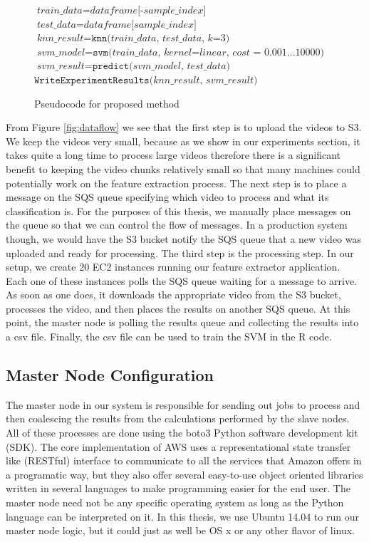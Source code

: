 \begin{figure}[h]
\begin{algorithmic}[1]
    \State $\textit{train\_data} = \textit{dataframe[-sample\_index]}$
    \State $\textit{test\_data} = \textit{dataframe[sample\_index]}$
    \State $\textit{knn\_result} = \texttt{knn(}\textit{train\_data, test\_data, k=3} \texttt{)}$
    \State $\textit{svm\_model} = \texttt{svm(}\textit{train\_data, kernel=linear, cost = 0.001...10000} \textit{)}$
    \State $\textit{svm\_result} = \texttt{predict(} \textit{svm\_model, test\_data} \texttt{)}$
  \EndFor
  \State $\texttt{WriteExperimentResults(} \textit{knn\_result, svm\_result} \texttt{)}$

\end{algorithmic}
\caption{Pseudocode for proposed method}
\label{alg:vida_pseudo_code}
\end{figure}

\FloatBarrier

From Figure \ref{fig:dataflow} we see that the first step is to upload
the videos to S3. We keep the videos very small, because as we show in our experiments
section, it takes quite a long time to process large videos therefore there is a
significant benefit to keeping the video chunks relatively small so that many
machines could potentially work on the feature extraction process. The next step
is to place a message on the SQS queue specifying which video to process and
what its classification is. For the purposes of this thesis, we manually place
messages on the queue so that we can control the flow of messages. In
a production system though, we would have the S3 bucket notify the SQS queue that
a new video was uploaded and ready for processing. The third step is the processing
step. In our setup, we create 20 EC2 instances running our feature extractor application.
Each one of these instances polls the SQS queue waiting for a message to arrive.
As soon as one does, it downloads the appropriate video from the S3 bucket,
processes the video, and then places the results on another SQS queue. At this
point, the master node is polling the results queue and collecting the results
into a csv file. Finally, the csv file can be used to train the SVM in the R
code.

\subsection{\label{subsection:master_node}Master Node Configuration}
The master node in our system is responsible for sending out jobs to process and
then coalescing the results from the calculations performed by the slave nodes.
All of these processes are done using the boto3 \cite{boto3} Python  software
development kit (SDK). The core implementation of AWS uses a  representational
state transfer like (RESTful) interface to communicate to all the services that
Amazon offers in a programatic  way, but they also offer several easy-to-use
object oriented libraries written  in several languages to make programming easier
for the end user. The master node
need not be any specific operating system as long as the Python language
can be interpreted on it. In this thesis, we use Ubuntu 14.04 to run our master
node logic, but it could just as well be OS x or any other flavor of linux.

